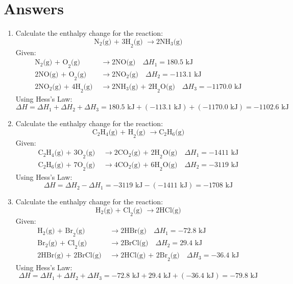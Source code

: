 \documentclass{article}
\begin{document}
\section*{Answers}
\begin{enumerate}
    \item Calculate the enthalpy change for the reaction:
    \[
    \text{N}_2\text{(g) + 3H}_2\text{(g) } \rightarrow \text{2NH}_3\text{(g)}
    \]
    Given:
    \begin{align*}
    \text{N}_2\text{(g) + O}_2\text{(g) } &\rightarrow \text{2NO(g)} \quad \Delta H_1 = 180.5 \text{ kJ} \\
    \text{2NO(g) + O}_2\text{(g) } &\rightarrow \text{2NO}_2\text{(g)} \quad \Delta H_2 = -113.1 \text{ kJ} \\
    \text{2NO}_2\text{(g) + 4H}_2\text{(g) } &\rightarrow \text{2NH}_3\text{(g) + 2H}_2\text{O(g)} \quad \Delta H_3 = -1170.0 \text{ kJ}
    \end{align*}
    Using Hess's Law:
    \[
    \Delta H = \Delta H_1 + \Delta H_2 + \Delta H_3 = 180.5 \text{ kJ} + (-113.1 \text{ kJ}) + (-1170.0 \text{ kJ}) = -1102.6 \text{ kJ}
    \]

    \item Calculate the enthalpy change for the reaction:
    \[
    \text{C}_2\text{H}_4\text{(g) + H}_2\text{(g) } \rightarrow \text{C}_2\text{H}_6\text{(g)}
    \]
    Given:
    \begin{align*}
    \text{C}_2\text{H}_4\text{(g) + 3O}_2\text{(g) } &\rightarrow \text{2CO}_2\text{(g) + 2H}_2\text{O(g)} \quad \Delta H_1 = -1411 \text{ kJ} \\
    \text{C}_2\text{H}_6\text{(g) + 7O}_2\text{(g) } &\rightarrow \text{4CO}_2\text{(g) + 6H}_2\text{O(g)} \quad \Delta H_2 = -3119 \text{ kJ}
    \end{align*}
    Using Hess's Law:
    \[
    \Delta H = \Delta H_2 - \Delta H_1 = -3119 \text{ kJ} - (-1411 \text{ kJ}) = -1708 \text{ kJ}
    \]

    \item Calculate the enthalpy change for the reaction:
    \[
    \text{H}_2\text{(g) + Cl}_2\text{(g) } \rightarrow \text{2HCl(g)}
    \]
    Given:
    \begin{align*}
    \text{H}_2\text{(g) + Br}_2\text{(g) } &\rightarrow \text{2HBr(g)} \quad \Delta H_1 = -72.8 \text{ kJ} \\
    \text{Br}_2\text{(g) + Cl}_2\text{(g) } &\rightarrow \text{2BrCl(g)} \quad \Delta H_2 = 29.4 \text{ kJ} \\
    \text{2HBr(g) + 2BrCl(g) } &\rightarrow \text{2HCl(g) + 2Br}_2\text{(g)} \quad \Delta H_3 = -36.4 \text{ kJ}
    \end{align*}
    Using Hess's Law:
    \[
    \Delta H = \Delta H_1 + \Delta H_2 + \Delta H_3 = -72.8 \text{ kJ} + 29.4 \text{ kJ} + (-36.4 \text{ kJ}) = -79.8 \text{ kJ}
    \]


\end{enumerate}
\end{document}
